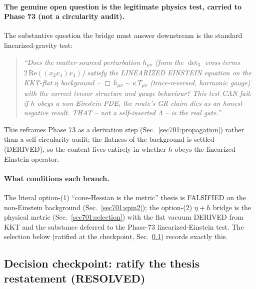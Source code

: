 \paragraph{The genuine open question is the legitimate physics test, carried to Phase 73
(not a circularity audit).} The substantive question the bridge must answer downstream is
the standard linearized-gravity test:
\begin{quote}\itshape
``Does the matter-sourced perturbation $h_{\mu\nu}$ (from the $\det_3$ cross-terms
$2\,\mathrm{Re}((x_2 x_1)x_3)$) satisfy the LINEARIZED EINSTEIN equation on the KKT-flat
$\eta$ background -- $\Box\,\bar h_{\mu\nu}\sim\kappa\,T_{\mu\nu}$ (trace-reversed,
harmonic gauge) with the correct tensor structure and gauge behaviour? This test CAN
fail: if $h$ obeys a non-Einstein PDE, the route's GR claim dies as an honest negative
result. THAT -- not a self-inserted $\Lambda$ -- is the real gate.''
\end{quote}
This reframes Phase 73 as a derivation step (Sec.~\ref{sec701:propagation}) rather than a
self-circularity audit; the flatness of the background is settled (DERIVED), so the
content lives entirely in whether $h$ obeys the linearized Einstein operator.

\paragraph{What conditions each branch.} The literal option-(1) ``cone-Hessian is the
metric'' thesis is FALSIFIED on the non-Einstein background (Sec.~\ref{sec701:spin2}); the
option-(2) $\eta+h$ bridge is the physical metric (Sec.~\ref{sec701:selection}) with the
flat vacuum DERIVED from KKT and the substance deferred to the Phase-73 linearized-Einstein
test. The selection below (ratified at the checkpoint, Sec.~\ref{sec701:checkpoint}) records
exactly this.

\subsection{Decision checkpoint: ratify the thesis restatement (RESOLVED)}
\label{sec701:checkpoint}

